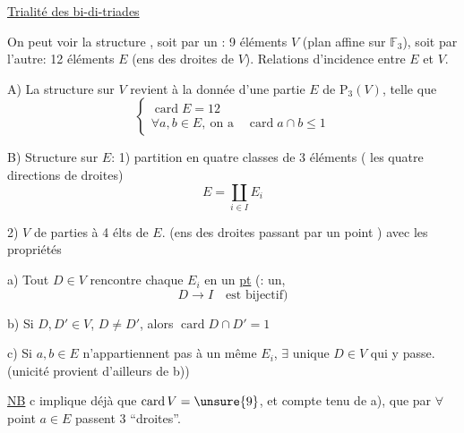 
\uline{Trialité des bi-di-triades}

On peut voir la structure , soit par un : 9 éléments $V$ (plan affine sur $\mathbb F_3$), soit par l'autre: 12 éléments $E$ (ens des droites de $V$). Relations d'incidence entre $E$ et $V$.


A) La structure sur $V$ revient à la donnée d'une partie $E$ de $\mathrm P_3(V)$, telle que
\[
\left\{\begin{array}{l}
\operatorname{card}E=12\\
\forall a,b\in E,\ \text{on a}\quad \operatorname{card}a\cap b\leq1
\end{array}\right.
\]


B) Structure sur $E$: 1) partition en quatre classes de 3 éléments ( les quatre directions de droites)
\[
E=\coprod_{i\in I}E_i
\]

2)  $V$ de parties à 4 élts de $E$. (ens des droites passant par un point ) avec les propriétés

a) Tout  $D\in V$ rencontre chaque $E_i$ en  un \uline{pt} (:  un,   
\[
D\longrightarrow I\quad\text{est bijectif})
\]

b) Si $D,D'\in V$, $D\neq D'$, alors $\operatorname{card}D\cap D'=1$


c) Si $a,b\in E$ n'appartiennent pas à un même $E_i$, $\exists$ unique $D\in V$ qui y passe. (unicité provient d'ailleurs de b))


\uline{NB} c implique déjà que $\operatorname{card}V=\unsure{9}$, et compte tenu de a), que par $\forall$ point $a\in E$ passent  3 ``droites''.
